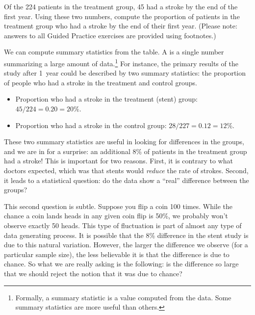 \begin{exercisewrap}
\begin{nexercise}
Of the 224 patients in the treatment group, 45 had a stroke by the end of the first year. Using these two numbers, compute the proportion of patients in the treatment group who had a stroke by the end of their first year. (Please note: answers to all Guided Practice exercises are provided using footnotes.)\footnotemark
\end{nexercise}
\end{exercisewrap}

We can compute summary statistics from the table. A  is a single number summarizing a large amount of data.\footnote{Formally, a summary statistic is a value computed from the data. Some summary statistics are more useful than others.} For instance, the primary results of the study after 1~year could be described by two summary statistics: the proportion of people who had a stroke in the treatment and control groups.
\begin{itemize}
\setlength{\itemsep}{0mm}
\item[] Proportion who had a stroke in the treatment (stent) group: $45/224 = 0.20 = 20\%$.
\item[] Proportion who had a stroke in the control group: $28/227 = 0.12 = 12\%$.
\end{itemize}
These two summary statistics are useful in looking for differences in the groups, and we are in for a surprise: an additional 8\% of patients in the treatment group had a stroke! This is important for two reasons. First, it is contrary to what doctors expected, which was that stents would \emph{reduce} the rate of strokes. Second, it leads to a statistical question: do the data show a ``real'' difference between the groups?

This second question is subtle. Suppose you flip a coin 100 times. While the chance a coin lands heads in any given coin flip is 50\%, we probably won't observe exactly 50 heads. This type of fluctuation is part of almost any type of data generating process. It is possible that the 8\% difference in the stent study is due to this natural variation. However, the larger the difference we observe (for a particular sample size), the less believable it is that the difference is due to chance. So what we are really asking is the following: is the difference so large that we should reject the notion that it was due to chance?


